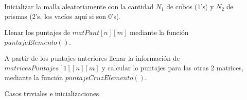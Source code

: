 \documentclass[]{article}
\newlength{\espacioVert}
\begin{document}
\begin{algorithm}[H]

	\vspace{\espacioVert}
	
	
	\vspace{\espacioVert}

	
	\vspace{\espacioVert}
	
	Inicializar la malla aleatoriamente con la cantidad $N_1$ de cubos (1's) y $N_2$ de prismas (2's, los vacíos aquí si son 0's).\;
	
	\vspace{\espacioVert}
	
	Llenar los puntajes de $matPunt[n][m]$ mediante la función $puntajeElemento()$.\;
	
	\vspace{\espacioVert}
	
	A partir de los puntajes anteriores llenar la información de $matricesPuntajes[1][n][m]$ y calcular lo puntajes para las otras 2 
	matrices, mediante la función $puntajeCruzElemento()$.\;
	
	\vspace{\espacioVert}
	
	
	\vspace{\espacioVert}

	\caption{Casos triviales e inicializaciones. \label{algo10}}

\end{algorithm}
\end{document}
